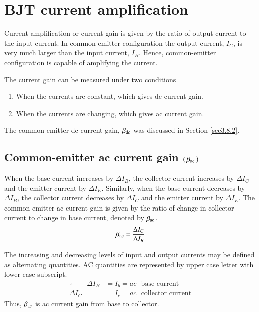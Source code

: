 \section{BJT current amplification}\label{sec3.14}

Current amplification or current gain is given by the ratio of output current to the input current. In common-emitter configuration the output current, $I_{C}$, is very much larger than the input current, $I_{B}$. Hence, common-emitter configuration is capable of amplifying the current.

The current gain can be measured under two conditions
\begin{enumerate}
\itemsep=0pt
\item When the currents are constant, which gives dc current gain.

\item When the currents are changing, which gives ac current gain.
\end{enumerate}

The common-emitter dc current gain, $\beta_{\operatorname{dc}}$ was discussed in Section \ref{sec3.8.2}.

\subsection[Common-emitter ac current gain $(\,\beta_{\ac}\,)$]{Common-emitter ac current gain \boldmath$(\,\beta_{\ac}\,)$}\label{sec3.14.1}

When the base current increases by $\Delta I_{B}$, the collector current increases by $\Delta I_{C}$ and the emitter current by $\Delta I_{E}$. Similarly, when the base current decreases by $\Delta I_{B}$, the collector current decreases by $\Delta I_{C}$ and the emitter current by $\Delta I_{E}$. The common-emitter ac current gain is given by the ratio of change in collector current to change in base current, denoted by $\beta_{\operatorname{ac}}$.
\begin{equation}
\beta_{\operatorname{ac}}=\dfrac{\Delta I_{C}}{\Delta I_{B}}\label{eq3.12}
\end{equation}

The increasing and decreasing levels of input and output currents may be defined as alternating quantities. AC quantities are represented by upper case letter with lower case subscript.
\begin{align*}
\therefore\qquad  \Delta I_{B}&= I_{b}=ac\text{~ base current}\\
                 \Delta I_{C} &= I_{c}=ac \text{~ collector current}
\end{align*}
Thus, $\beta_{\operatorname{ac}}$ is ac current gain from base to collector.

